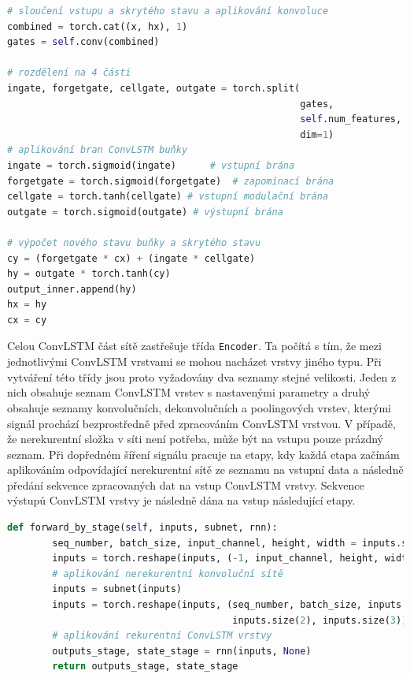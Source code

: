 \begin{lstlisting}[language=Python, caption={kód popisující dopředné šíření signálu v ConvLSTM vrstvě}]    
# sloučení vstupu a skrytého stavu a aplikování konvoluce
combined = torch.cat((x, hx), 1)
gates = self.conv(combined) 

# rozdělení na 4 části
ingate, forgetgate, cellgate, outgate = torch.split(
													gates,
													self.num_features,
													dim=1)
# aplikování bran ConvLSTM buňky
ingate = torch.sigmoid(ingate)		# vstupní brána
forgetgate = torch.sigmoid(forgetgate)	# zapomínací brána
cellgate = torch.tanh(cellgate)	# vstupní modulační brána
outgate = torch.sigmoid(outgate) # výstupní brána

# výpočet nového stavu buňky a skrytého stavu
cy = (forgetgate * cx) + (ingate * cellgate)
hy = outgate * torch.tanh(cy)
output_inner.append(hy)
hx = hy
cx = cy
\end{lstlisting}

Celou ConvLSTM část sítě zastřešuje třída \texttt{Encoder}.
Ta počítá s tím, že mezi jednotlivými ConvLSTM vrstvami se mohou nacházet vrstvy jiného typu.
Při vytváření této třídy jsou proto vyžadovány dva seznamy stejné velikosti.
Jeden z nich obsahuje seznam ConvLSTM vrstev s nastavenými parametry a druhý obsahuje seznamy konvolučních, dekonvolučních a poolingových vrstev, kterými signál prochází bezprostředně před zpracováním ConvLSTM vrstvou.
V případě, že nerekurentní složka v síti není potřeba, může být na vstupu pouze prázdný seznam.
Při dopředném šíření signálu pracuje na etapy, kdy každá etapa začínám aplikováním odpovídající nerekurentní sítě ze seznamu na vstupní data a následně předání sekvence zpracovaných dat na vstup ConvLSTM vrstvy.
Sekvence výstupů ConvLSTM vrstvy je následně dána na vstup následující etapy.

\begin{lstlisting}[language=Python, caption={Kód popisující dopředné šíření signálu během jedné etapy}]    
    def forward_by_stage(self, inputs, subnet, rnn):
        seq_number, batch_size, input_channel, height, width = inputs.size()
        inputs = torch.reshape(inputs, (-1, input_channel, height, width))
        # aplikování nerekurentní konvoluční sítě
        inputs = subnet(inputs)
        inputs = torch.reshape(inputs, (seq_number, batch_size, inputs.size(1),
                                        inputs.size(2), inputs.size(3)))
        # aplikování rekurentní ConvLSTM vrstvy
        outputs_stage, state_stage = rnn(inputs, None)
        return outputs_stage, state_stage
\end{lstlisting}

